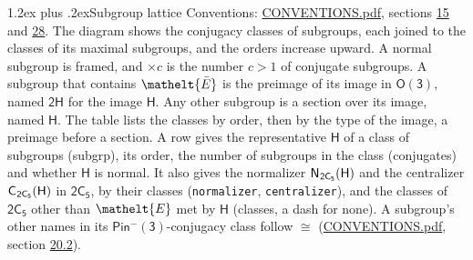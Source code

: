 \documentclass[10pt,a4paper]{article}
\makeatletter
\renewcommand\section{\@startsection{section}{1}{\z@}{-3ex plus -1ex minus -.2ex}%
  {1.2ex plus .2ex}{\normalfont\large\sffamily\bfseries\color{parttitle}}}
\numberwithin{equation}{section}
\newcommand{\eltfont}[1]{{\let\sigma\eltsigma\mathelt{#1}}}
\newcommand{\grp}[1]{\mathsf{#1}}
\newcommand{\cls}[1]{\eltfont{#1}}
\newcommand{\elt}[1]{\eltfont{#1}}
\newcommand{\samecls}{\cong}
\newcommand{\barred}[1]{\bar{#1}}
\newcommand{\hairsp}{\mkern1mu}
\makeatother
\begin{document}
\section{Subgroup lattice}\label{s:subgroups}
Conventions: \href{../../CONVENTIONS.pdf}{CONVENTIONS.pdf}, sections \href{../../../rotation/CONVENTIONS.pdf\#conv.15}{15} and \href{../../CONVENTIONS.pdf\#conv.28}{28}.
The diagram shows the conjugacy classes of subgroups, each joined to the classes of its maximal subgroups, and the orders increase upward. \label{n:index.conjugates.c}A normal subgroup is framed, and ${\times}c$ is the number $c > 1$ of conjugate subgroups. \label{n:group.H}A subgroup that contains $\elt{\barred{E}}$ is the preimage of its image in $\grp{O(3)}$, named $\grp{2H}$ for the image $\grp{H}$. Any other subgroup is a section over its image, named $\grp{H}$. The table lists the classes by order, then by the type of the image, a preimage before a section. \label{n:head.subgroup}\label{n:head.order}\label{n:head.conjugates}\label{n:head.normal}A row gives the representative $\grp{H}$ of a class of subgroups (subgrp), its order, the number of subgroups in the class (conjugates) and whether $\grp{H}$ is normal. \label{n:group.normalizer}\label{n:group.centralizer}\label{n:head.classes}It also gives the normalizer $\grp{N}_{\hairsp \grp{2C_{5}}}(\grp{H})$ and the centralizer $\grp{C}_{\hairsp \grp{2C_{5}}}(\grp{H})$ in $\grp{2C_{5}}$, by their classes (\texttt{normalizer}, \texttt{centralizer}), and the classes of $\grp{2C_{5}}$ other than $\cls{E}$ met by $\grp{H}$ (classes, a dash for none). A subgroup's other names in its \href{Pinminus3.pdf}{$\grp{Pin^{-}(3)}$}-conjugacy class follow $\samecls$ (\href{../../CONVENTIONS.pdf}{CONVENTIONS.pdf}, section \href{../../CONVENTIONS.pdf\#conv.20.2}{20.2}).
\begin{center}
\end{center}
\end{document}
